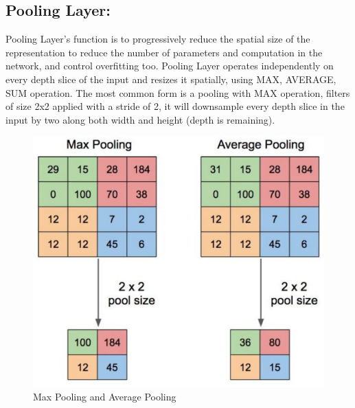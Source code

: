 \subsection{Pooling Layer:}
Pooling Layer's function is to progressively reduce the spatial size of the representation to reduce the number of parameters and computation in the network, and control overfitting too. Pooling Layer operates independently on every depth slice of the input and resizes it spatially, using MAX, AVERAGE, SUM operation. The most common form is a pooling with MAX operation, filters of size 2x2 applied with a stride of 2, it will downsample every depth slice in the input by two along both width and height (depth is remaining).\\
\begin{center}
  \begin{figure}[H]
  \centering
  \includegraphics[width=1\columnwidth]{images/chap2/Pooling.png}
  \caption{Max Pooling and Average Pooling}
  \label{chap2:MaxPooling and Average Polling}
  \end{figure}
\end{center}

